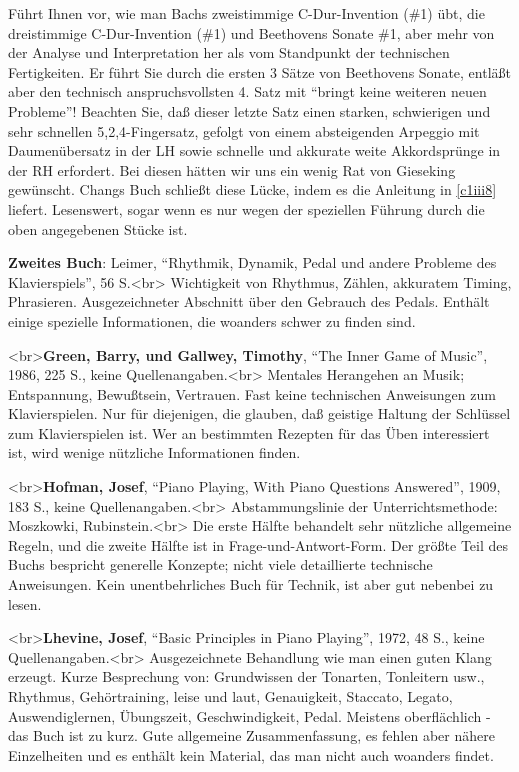 Führt Ihnen vor, wie man Bachs zweistimmige C-Dur-Invention (\#1) übt, die dreistimmige C-Dur-Invention (\#1) und Beethovens Sonate \#1, aber mehr von der Analyse und Interpretation her als vom Standpunkt der technischen Fertigkeiten.
Er führt Sie durch die ersten 3 Sätze von Beethovens Sonate, entläßt aber den technisch anspruchsvollsten 4. Satz mit \enquote{bringt keine weiteren neuen Probleme}!
Beachten Sie, daß dieser letzte Satz einen starken, schwierigen und sehr schnellen 5,2,4-Fingersatz, gefolgt von einem absteigenden Arpeggio mit Daumenübersatz in der LH sowie schnelle und akkurate weite Akkordsprünge in der RH erfordert.
Bei diesen hätten wir uns ein wenig Rat von Gieseking gewünscht.
Changs Buch schließt diese Lücke, indem es die Anleitung in \hyperref[c1iii8]{\autoref{c1iii8}} liefert.
Lesenswert, sogar wenn es nur wegen der speziellen Führung durch die oben angegebenen Stücke ist.

\textbf{Zweites Buch}: Leimer, \enquote{Rhythmik, Dynamik, Pedal und andere Probleme des Klavierspiels}, 56 S.<br>
Wichtigkeit von Rhythmus, Zählen, akkuratem Timing, Phrasieren.
Ausgezeichneter Abschnitt über den Gebrauch des Pedals.
Enthält einige spezielle Informationen, die woanders schwer zu finden sind.


\label{Green}

<br>\textbf{Green, Barry, und Gallwey, Timothy}, \enquote{The Inner Game of Music}, 1986, 225 S., keine Quellenangaben.<br>
 Mentales Herangehen an Musik; Entspannung, Bewußtsein, Vertrauen.
Fast keine technischen Anweisungen zum Klavierspielen.
Nur für diejenigen, die glauben, daß geistige Haltung der Schlüssel zum Klavierspielen ist.
Wer an bestimmten Rezepten für das Üben interessiert ist, wird wenige nützliche Informationen finden.


\label{Hofman}

<br>\textbf{Hofman, Josef}, \enquote{Piano Playing, With Piano Questions Answered}, 1909, 183 S., keine Quellenangaben.<br>
Abstammungslinie der Unterrichtsmethode: Moszkowki, Rubinstein.<br>
Die erste Hälfte behandelt sehr nützliche allgemeine Regeln, und die zweite Hälfte ist in Frage-und-Antwort-Form.
Der größte Teil des Buchs bespricht generelle Konzepte; nicht viele detaillierte technische Anweisungen.
Kein unentbehrliches Buch für Technik, ist aber gut nebenbei zu lesen.


\label{Lhevine}

<br>\textbf{Lhevine, Josef}, \enquote{Basic Principles in Piano Playing}, 1972, 48 S., keine Quellenangaben.<br> Ausgezeichnete Behandlung wie man einen guten Klang erzeugt.
Kurze Besprechung von: Grundwissen der Tonarten, Tonleitern usw., Rhythmus, Gehörtraining, leise und laut, Genauigkeit, Staccato, Legato, Auswendiglernen, Übungszeit, Geschwindigkeit, Pedal.
Meistens oberflächlich - das Buch ist zu kurz.
Gute allgemeine Zusammenfassung, es fehlen aber nähere Einzelheiten und es enthält kein Material, das man nicht auch woanders findet.


